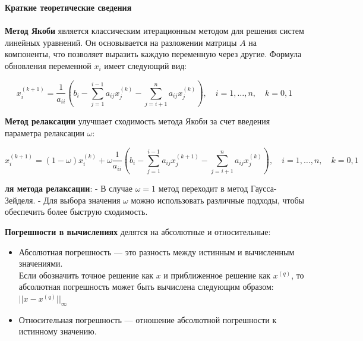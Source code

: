 \documentclass[a4paper, 12pt]{report}
\begin{document}
\newpage
\textbf{\Huge{Краткие теоретические сведения}}\\\\
\textbf{Метод Якоби} является классическим итерационным методом для решения систем линейных уравнений. Он основывается на разложении матрицы $A$ на компоненты, что позволяет выразить каждую переменную через другие. Формула обновления переменной $x_i$ имеет следующий вид:

\[
x_i^{(k+1)} = \frac{1}{a_{ii}} \left( b_i - \sum_{j=1}^{i-1} a_{ij} x_j^{(k)} - \sum_{j=i+1}^{n} a_{ij} x_j^{(k)} \right), \quad i = 1, \ldots, n, \quad k = 0, 1
\]

\textbf{Метод релаксации} улучшает сходимость метода Якоби за счет введения параметра релаксации $\omega$:

\[
x_i^{(k + 1)} = (1 - \omega)x_i^{(k)} + \omega \dfrac{1}{a_{ii}} \left( b_i - \sum_{j=1}^{i-1} a_{ij} x_j^{(k + 1)} - \sum_{j=i+1}^{n} a_{ij} x_j^{(k)} \right), \quad i = 1, \ldots, n, \quad k = 0, 1
\]

\textbf{ля метода релаксации}:
- В случае $\omega = 1$ метод переходит в метод Гаусса-Зейделя.
- Для выбора значения $\omega$ можно использовать различные подходы, чтобы обеспечить более быструю сходимость.

\textbf{Погрешности в вычислениях} делятся на абсолютные и относительные:
\begin{itemize}
    \item Абсолютная погрешность — это разность между истинным и вычисленным значениями.\\
Если обозначить точное решение как $x$ и приближенное решение как $x^{(q)}$, то абсолютная погрешность может быть вычислена следующим образом: $||x - x^{(q)}||_{\infty}$
    \item Относительная погрешность — отношение абсолютной погрешности к истинному значению.
    
\end{itemize}
\end{document}
